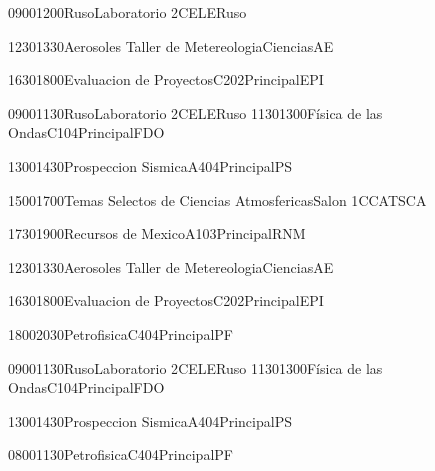 \documentclass[a4paper,10pt]{report}
\begin{document}
\begin{landscape}
\begin{timetable}
    {0900}{1200}{Ruso}{Laboratorio 2}{{\tiny CELE}}{Ruso}
  
    {1230}{1330}{Aerosoles }{Taller de Metereologia}{{\tiny Ciencias}}{AE}
   
    {1630}{1800}{Evaluacion de Proyectos}{C202}{{\tiny Principal}}{EPI}
   
   
    {0900}{1130}{Ruso}{Laboratorio 2}{{\tiny CELE}}{Ruso}
    {1130}{1300}{Física de las Ondas}{C104}{{\tiny Principal}}{FDO}
   
    {1300}{1430}{Prospeccion Sismica}{A404}{{\tiny  Principal}}{PS}
   
    {1500}{1700}{Temas Selectos de Ciencias Atmosfericas}{Salon 1}{{\tiny CCA}}{TSCA}
   
    {1730}{1900}{Recursos de Mexico}{A103}{{\tiny Principal}}{RNM}
   
   
   
    {1230}{1330}{Aerosoles }{Taller de Metereologia}{{\tiny Ciencias}}{AE}
   
    {1630}{1800}{Evaluacion de Proyectos}{C202}{{\tiny Principal}}{EPI}
   
    {1800}{2030}{Petrofisica}{C404}{{\tiny Principal}}{PF}
   

   
      {0900}{1130}{Ruso}{Laboratorio 2}{{\tiny CELE}}{Ruso}
    {1130}{1300}{Física de las Ondas}{C104}{{\tiny Principal}}{FDO}
   
    {1300}{1430}{Prospeccion Sismica}{A404}{{\tiny  Principal}}{PS}
   
  
     {0800}{1130}{Petrofisica}{C404}{{\tiny Principal}}{PF}
  
   
 \end{timetable}
 \end{landscape}
 
\end{document}
